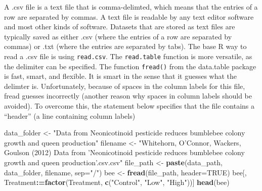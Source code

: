 \documentclass[]{book}
\newenvironment{Shaded}{\begin{snugshade}}{\end{snugshade}}
\newcommand{\KeywordTok}[1]{\textcolor[rgb]{0.13,0.29,0.53}{\textbf{#1}}}
\newcommand{\DataTypeTok}[1]{\textcolor[rgb]{0.13,0.29,0.53}{#1}}
\newcommand{\StringTok}[1]{\textcolor[rgb]{0.31,0.60,0.02}{#1}}
\newcommand{\OtherTok}[1]{\textcolor[rgb]{0.56,0.35,0.01}{#1}}
\newcommand{\OperatorTok}[1]{\textcolor[rgb]{0.81,0.36,0.00}{\textbf{#1}}}
\newcommand{\ErrorTok}[1]{\textcolor[rgb]{0.64,0.00,0.00}{\textbf{#1}}}
\newcommand{\NormalTok}[1]{#1}
\begin{document}
A .csv file is a text file that is comma-delimted, which means that the
entries of a row are separated by commas. A text file is readable by any
text editor software and most other kinds of software. Datasets that are
stored as text files are typically saved as either .csv (where the
entries of a row are separated by commas) or .txt (where the entries are
separated by tabs). The base R way to read a .csv file is using
\texttt{read.csv}. The \texttt{read.table} function is more versatile,
as the delimiter can be specified. The function \texttt{fread()} from
the data.table package is fast, smart, and flexible. It is smart in the
sense that it guesses what the delimter is. Unfortunately, because of
spaces in the column labels for this file, fread guesses incorrectly
(another reason why spaces in column labels should be avoided). To
overcome this, the statement below specifies that the file contains a
``header'' (a line containing column labels)

\begin{Shaded}
\begin{Highlighting}[]
\NormalTok{data_folder <-}\StringTok{ "Data from Neonicotinoid pesticide reduces bumblebee colony growth and queen production"}
\NormalTok{filename <-}\StringTok{ "Whitehorn, O'Connor, Wackers, Goulson (2012) Data from 'Neonicotinoid pesticide reduces bumblebee colony growth and queen production'.csv.csv"}
\NormalTok{file_path <-}\StringTok{ }\KeywordTok{paste}\NormalTok{(data_path, data_folder, filename, }\DataTypeTok{sep=}\StringTok{"/"}\NormalTok{)}
\NormalTok{bee <-}\StringTok{ }\KeywordTok{fread}\NormalTok{(file_path, }\DataTypeTok{header=}\OtherTok{TRUE}\NormalTok{)}
\NormalTok{bee[, Treatment}\OperatorTok{:}\ErrorTok{=}\KeywordTok{factor}\NormalTok{(Treatment, }\KeywordTok{c}\NormalTok{(}\StringTok{"Control"}\NormalTok{, }\StringTok{"Low"}\NormalTok{, }\StringTok{"High"}\NormalTok{))]}
\KeywordTok{head}\NormalTok{(bee)}
\end{Highlighting}
\end{Shaded}
\end{document}
